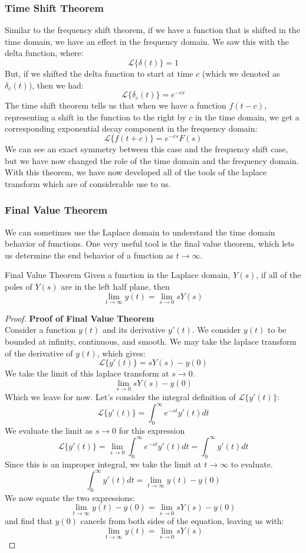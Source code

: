 \subsubsection{Time Shift Theorem}
Similar to the frequency shift theorem, if we have a function that is shifted in the time domain, we have an effect in the frequency domain. We saw this with the delta function, where:
$$\mathscr{L}\{\delta(t)\}=1$$
But, if we shifted the delta function to start at time $c$ (which we denoted as $\delta_c(t)$), then we had:
$$\mathscr{L}\{\delta_c(t)\}=e^{-cs}$$
The time shift theorem tells us that when we have a function $f(t-c)$, representing a shift in the function to the right by $c$ in the time domain, we get a corresponding exponential decay component in the frequency domain:
$$\mathscr{L}\{f(t+c)\}=e^{-cs}F(s)$$
We can see an exact symmetry between this case and the frequency shift case, but we have now changed the role of the time domain and the frequency domain. With this theorem, we have now developed all of the tools of the \gls{laplace transform} which are of considerable use to us.

\subsubsection{Final Value Theorem}
We can sometimes use the Laplace domain to understand the time domain behavior of functions. One very useful tool is the final value theorem, which lets us determine the end behavior of a function as $t\rightarrow \infty$.

\begin{theorem}{Final Value Theorem}
    Given a function in the Laplace domain, $Y(s)$, if all of the poles of $Y(s)$ are in the left half plane, then
    $$\lim_{t\rightarrow\infty} y(t)=\lim_{s\rightarrow 0}sY(s)$$
\end{theorem}
\begin{proof}\textbf{Proof of Final Value Theorem}\\
Consider a function $y(t)$ and its derivative $y'(t)$. We consider $y(t)$ to be bounded at infinity, continuous, and smooth. We may take the \gls{laplace transform} of the derivative of $y(t)$, which gives:
$$\mathscr{L}\{y'(t)\}=sY(s)-y(0)$$
We take the limit of this \gls{laplace transform} at $s\rightarrow 0$.
$$\lim_{s\rightarrow0}sY(s)-y(0)$$
Which we leave for now. Let's consider the integral definition of $\mathscr{L}\{y'(t)\}$:
$$\mathscr{L}\{y'(t)\}=\int_0^\infty{}e^{-st}y'(t)dt$$
We evaluate the limit as $s\rightarrow0$ for this expression
    $$\mathscr{L}\{y'(t)\}=\lim_{s\rightarrow0}\int_0^\infty{}e^{-st}y'(t)dt=\int_0^\infty{}y'(t)dt$$
    Since this is an improper integral, we take the limit at $t\rightarrow\infty$ to evaluate.
    $$\int_0^\infty{}y'(t)dt=\lim_{t\rightarrow\infty}y(t)-y(0)$$
    We now equate the two expressions:
    $$\lim_{t\rightarrow\infty}y(t)-y(0)=\lim_{s\rightarrow0}sY(s)-y(0)$$
    and find that $y(0)$ cancels from both sides of the equation, leaving us with:
      $$\lim_{t\rightarrow\infty}y(t)=\lim_{s\rightarrow0}sY(s)$$
\end{proof}
\
